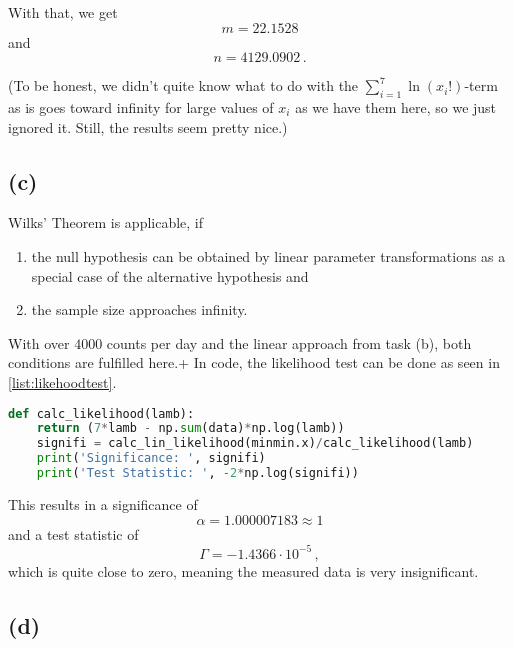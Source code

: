 With that, we get
\begin{equation*}
    m = 22.1528
\end{equation*}
and
\begin{equation*}
    n = 4129.0902 \,.
\end{equation*}

(To be honest, we didn't quite know what to do with the $\sum_{i=1}^7 \ln(x_i!)$-term as is goes toward infinity for large values of $x_i$ as we have them here, so we just ignored it. 
Still, the results seem pretty nice.)

\subsection*{(c)}

Wilks' Theorem is applicable, if
\begin{enumerate}
    \item the null hypothesis can be obtained by linear parameter transformations as a special case of the alternative hypothesis and
    \item the sample size approaches infinity.
\end{enumerate}

With over $4000$ counts per day and the linear approach from task (b), both conditions are fulfilled here.+
In code, the likelihood test can be done as seen in \autoref{list:likehoodtest}.

\begin{lstlisting}[language = Python, caption={Calculation of Significance $\alpha$ and the test statistic $\Gamma$.}, label = {list:likehoodtest}]
    def calc_likelihood(lamb):
    return (7*lamb - np.sum(data)*np.log(lamb))
    signifi = calc_lin_likelihood(minmin.x)/calc_likelihood(lamb)
    print('Significance: ', signifi)
    print('Test Statistic: ', -2*np.log(signifi))
\end{lstlisting}

This results in a significance of
\begin{equation*}
    \alpha = 1.000007183 \approx 1
\end{equation*}
and a test statistic of
\begin{equation*}
    \Gamma = -1.4366 \cdot 10^{-5} \,,
\end{equation*}
which is quite close to zero, meaning the measured data is very insignificant.

\subsection*{(d)}

